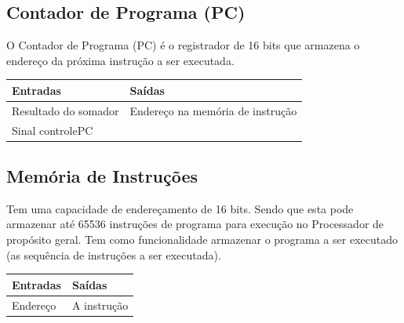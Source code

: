 \documentclass{article}
\begin{document}
 \subsection{Contador de Programa (PC)}
    O Contador de Programa (PC) é o registrador de 16 bits que armazena o endereço da próxima instrução a ser executada.
 \FloatBarrier
    \begin{table}[H]
      \begin{center}
        \begin{tabular}[pos]{|m{7cm} | m{7cm}|} 
          \hline
          \cellcolor[gray]{0.9}\textbf{Entradas} & \cellcolor[gray]{0.9}\textbf{Saídas} \\ \hline
            Resultado do somador & Endereço na memória de instrução\\ \hline
            Sinal controlePC & \\ \hline
        \end{tabular}
      \end{center}
    \end{table}  
    
 \subsection{Memória de Instruções}
    Tem uma capacidade de endereçamento de 16 bits. Sendo que esta pode armazenar até 65536 instruções de programa para execução no Processador de propósito geral. Tem como funcionalidade armazenar o programa a ser executado (as sequência de instruções a ser executada).
  \FloatBarrier
    \begin{table}[H]
      \begin{center}
        \begin{tabular}[pos]{|m{7cm} | m{7cm}|} 
          \hline
          \cellcolor[gray]{0.9}\textbf{Entradas} & \cellcolor[gray]{0.9}\textbf{Saídas} \\ \hline
            Endereço & A instrução \\ \hline
        \end{tabular}
      \end{center}
    \end{table}  
    
\end{document}
